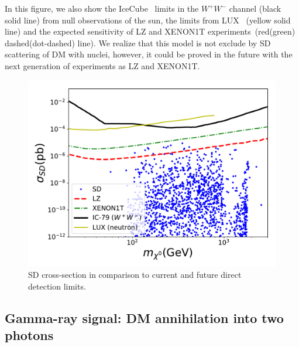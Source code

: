 \documentclass[12pt,letterpaper]{article}
\begin{document}
In this figure, we also show the IceCube~\cite{2013PhRvL.110m1302A} limits in the $W^+W^-$ channel (black solid line) from null observations of the sun, the limits from LUX~\cite{Akerib:2016lao} (yellow solid line) and the expected sensitivity of LZ and XENON1T experiments~\cite{Cushman:2013zza}(red(green) dashed(dot-dashed) line).
We realize that this model is not exclude by SD scattering of DM with nuclei, however, it could be proved in the future with the next generation of experiments as LZ and XENON1T.
%
\begin{figure}[h]
\begin{center}
\includegraphics[scale=0.5]{sigmaSD_with_neutrino_physics}
\caption{ SD cross-section  in comparison to current and future direct detection limits.  
}
\label{fig:SD-scan}
\end{center}
\end{figure}
%








\subsection{Gamma-ray signal: DM annihilation into two photons}
\label{sec:gamma-ray}
  
\end{document}
